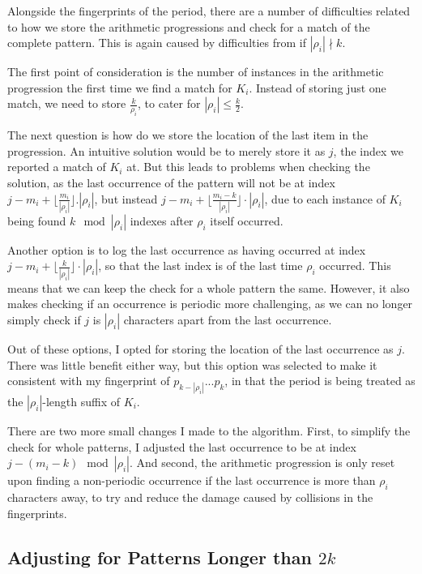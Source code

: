\documentclass[ %
                    author={Dominic Joseph Moylett},
                    degree={MEng},
                     title={Dictionary Matching with Fingerprints},
                  subtitle={An Empirical Analysis},
                      type={research},
                      year={2015} ]{dissertation}
\begin{document}
Alongside the fingerprints of the period, there are a number of difficulties related to how we store the arithmetic progressions and check for a match of the complete pattern. This is again caused by difficulties from if $|\rho_i| \nmid k$.

The first point of consideration is the number of instances in the arithmetic progression the first time we find a match for $K_i$. Instead of storing just one match, we need to store $\frac{k}{\rho_i}$, to cater for $|\rho_i| \leq \frac{k}{2}$.

The next question is how do we store the location of the last item in the progression. An intuitive solution would be to merely store it as $j$, the index we reported a match of $K_i$ at. But this leads to problems when checking the solution, as the last occurrence of the pattern will not be at index $j - m_i + \lfloor\frac{m_i}{|\rho_i|}\rfloor.|\rho_i|$, but instead $j - m_i + \lfloor\frac{m_i - k}{|\rho_i|}\rfloor\cdot|\rho_i|$, due to each instance of $K_i$ being found $k \mod |\rho_i|$ indexes after $\rho_i$ itself occurred.

Another option is to log the last occurrence as having occurred at index $j - m_i + \lfloor\frac{k}{|\rho_i|}\rfloor\cdot|\rho_i|$, so that the last index is of the last time $\rho_i$ occurred. This means that we can keep the check for a whole pattern the same. However, it also makes checking if an occurrence is periodic more challenging, as we can no longer simply check if $j$ is $|\rho_i|$ characters apart from the last occurrence.

Out of these options, I opted for storing the location of the last occurrence as $j$. There was little benefit either way, but this option was selected to make it consistent with my fingerprint of $p_{k - |\rho_i|}...p_k$, in that the period is being treated as the $|\rho_i|$-length suffix of $K_i$.

There are two more small changes I made to the algorithm. First, to simplify the check for whole patterns, I adjusted the last occurrence to be at index $j - (m_i - k) \mod |\rho_i|$. And second, the arithmetic progression is only reset upon finding a non-periodic occurrence if the last occurrence is more than $\rho_i$ characters away, to try and reduce the damage caused by collisions in the fingerprints.

\subsection{Adjusting for Patterns Longer than $2k$}
\end{document}
